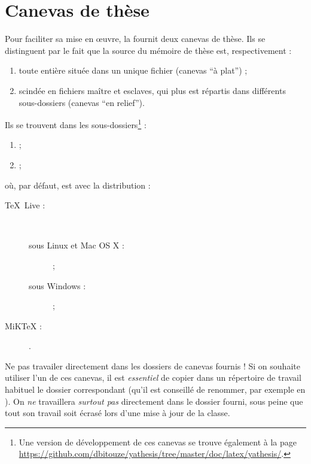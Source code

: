 \chapter{Canevas de thèse}\label{cha:canevas}

Pour faciliter sa mise en œuvre, la \yatcl fournit deux canevas de thèse. Ils
se distinguent par le fait que la source  du mémoire de thèse est,
respectivement :
\begin{enumerate}
\item toute entière située dans un unique fichier (canevas \enquote{à plat}) ;
\item scindée en fichiers maître et esclaves, qui plus est répartis dans
  différents sous-dossiers (canevas \enquote{en relief}).
\end{enumerate}
Ils se trouvent dans les sous-dossiers\footnote{Une version de
  développement de ces canevas se trouve également à la page
  \url{https://github.com/dbitouze/yathesis/tree/master/doc/latex/yathesis/}.} :
\begin{enumerate}
\item {} ;
\item {} ;
\end{enumerate}
où, par défaut,  est avec la distribution :
\begin{description}
\item[\TeX{}~Live :]\
  \begin{description}
  \item[sous Linux et Mac OS X :] \unixtldirectory\tldistdirectory\versiontl ;
  \item[sous Windows :] \wintldirectory\tldistdirectory\versiontl ;
  \end{description}
\item[MiK\TeX{} :] \miktexdistdirectory.
\end{description}

\begin{dbwarning}{Ne pas travailer directement dans les dossiers de canevas
    fournis !}{}
  Si on souhaite utiliser l'un de ces canevas, il est \emph{essentiel} de
  copier dans un répertoire de travail habituel le dossier correspondant (qu'il
  est conseillé de renommer, par exemple en \directory{these}). On \emph{ne}
  travaillera \emph{surtout pas} directement dans le dossier fourni, sous peine
  que tout son travail soit écrasé lors d'une mise à jour de la classe.
\end{dbwarning}

